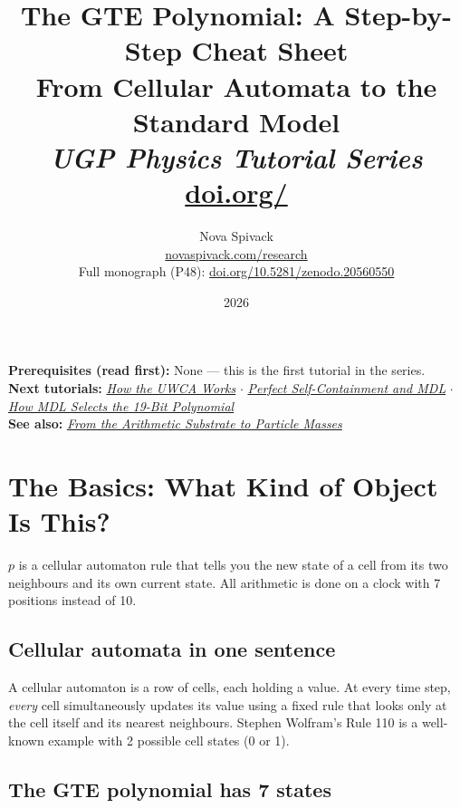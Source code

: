 \documentclass[11pt,a4paper]{article}
\title{\textbf{The GTE Polynomial: A Step-by-Step Cheat Sheet}\\[6pt]
\large From Cellular Automata to the Standard Model\\[4pt]\normalsize\textit{UGP Physics Tutorial Series}
\\[2pt]\small\href{https://doi.org/\TutorialDOI}{doi.org/\TutorialDOI}}
\author{Nova Spivack\\[4pt]
\normalsize
\href{https://novaspivack.com/research}{novaspivack.com/research}\\[2pt]
\small Full monograph (P48):
\href{https://doi.org/10.5281/zenodo.20560550}{doi.org/10.5281/zenodo.20560550}
}
\date{2026}
\begin{document}
\setcounter{tocdepth}{2}
\maketitle
\tableofcontents
\newpage

\begin{tcolorbox}[colback=blue!6,colframe=blue!40!black,
  title=\textbf{UGP Physics Tutorial Series}]
\textbf{Prerequisites (read first):} None — this is the first tutorial in the series.\\[4pt]
\textbf{Next tutorials:} \href{https://doi.org/10.5281/zenodo.20657919}{\emph{How the UWCA Works}} $\cdot$ \href{https://doi.org/10.5281/zenodo.20657895}{\emph{Perfect Self-Containment and MDL}} $\cdot$ \href{https://doi.org/10.5281/zenodo.20657876}{\emph{How MDL Selects the 19-Bit Polynomial}}\\[4pt]
\textbf{See also:} \href{https://doi.org/10.5281/zenodo.20657913}{\emph{From the Arithmetic Substrate to Particle Masses}}
\end{tcolorbox}


\section{The Basics: What Kind of Object Is This?}

\begin{tcolorbox}[colback=boxblue,colframe=blue!40!black,title=The one-line answer]
$p$ is a cellular automaton rule that tells you the new state of a cell from
its two neighbours and its own current state.  All arithmetic is done on a
clock with 7 positions instead of 10.
\end{tcolorbox}

\subsection{Cellular automata in one sentence}

A cellular automaton is a row of cells, each holding a value.  At every
time step, \emph{every} cell simultaneously updates its value using a fixed
rule that looks only at the cell itself and its nearest neighbours.
Stephen Wolfram's Rule 110 is a well-known example with 2 possible cell
states (0 or 1).

\subsection{The GTE polynomial has 7 states}
\end{document}
